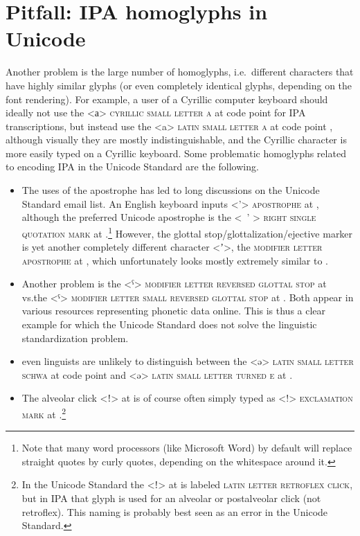 \section{Pitfall: IPA homoglyphs in Unicode}
\label{pitfall-ipa-homoglyphs}

Another problem is the large number of homoglyphs, i.e.~different characters
that have highly similar glyphs (or even completely identical glyphs, depending
on the font rendering). For example, a user of a Cyrillic computer keyboard
should ideally not use the <а> \textsc{cyrillic small letter a} at code point
 for IPA transcriptions, but instead use the <a> \textsc{latin small
letter a} at code point , although visually they are mostly
indistinguishable, and the Cyrillic character is more easily typed on a Cyrillic
keyboard. Some problematic homoglyphs related to encoding IPA in the Unicode Standard are 
the following.
\begin{itemize}

  \item The uses of the apostrophe has led to long discussions on the Unicode
     Standard email list. An English keyboard inputs <{'}> \textsc{apostrophe}
     at , although the preferred Unicode apostrophe is the <\ ' >
     \textsc{right single quotation mark} at .\footnote{Note that many word 
     processors (like Microsoft Word) by default will replace straight quotes by 
     curly quotes, depending on the whitespace around it.} However, the glottal stop/glottalization/ejective marker is yet 
     another completely different character <{\large ʼ}>, the 
     \textsc{modifier letter apostrophe} at , which unfortunately looks 
     mostly extremely similar to . 
  \item Another problem is the <ˁ> \textsc{modifier letter reversed
     glottal stop} at  vs.\@ the <ˤ> \textsc{modifier
     letter small reversed glottal stop} at . Both 
     appear in various resources representing phonetic data online. This is
     thus a clear example for which the Unicode Standard does not solve the
     linguistic standardization problem.
  \item even linguists are unlikely to distinguish between the <ə>
     \textsc{latin small letter schwa} at code point  and <ǝ>
     \textsc{latin small letter turned e} at .
  \item  The alveolar click <ǃ> at  is of course often simply
     typed as <!> \textsc{exclamation mark} at .\footnote{In the Unicode
     Standard the <ǃ> at  is labeled \textsc{latin letter retroflex
     click}, but in IPA that glyph is used for an alveolar or postalveolar
     click (not retroflex). This naming is probably best seen as an 
     error in the Unicode Standard.}

\end{itemize} 


